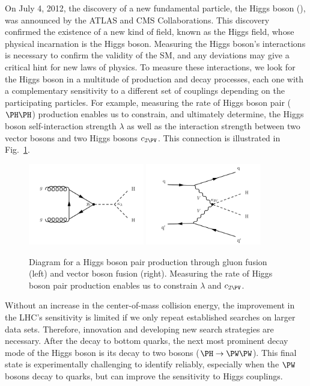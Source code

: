 \documentclass[11pt,letterpaper,notitlepage]{article}
\begin{document}
On July 4, 2012, the discovery of a new fundamental particle, the Higgs boson (\PH), was announced by the ATLAS and CMS Collaborations.
This discovery confirmed the existence of a new kind of field, known as the Higgs field, whose physical incarnation is the Higgs boson.
Measuring the Higgs boson's interactions is necessary to confirm the validity of the SM, and any deviations may give a critical hint for new laws of physics.
To measure these interactions, we look for the Higgs boson in a multitude of production and decay processes, each one with a complementary sensitivity to a different set of couplings depending on the participating particles.
For example, measuring the rate of Higgs boson pair ($\PH\PH$) production enables us to constrain, and ultimately determine, the Higgs boson self-interaction strength $\lambda$ as well as the interaction strength between two vector bosons and two Higgs bosons $c_{2\PV}$.
This connection is illustrated in Fig.~\ref{fig:higgs}.

\begin{figure}[htb]
    \centering
    \includegraphics[width=0.45\textwidth]{CMS-PAS-HIG-23-012_Figure_001-a.pdf}
    \includegraphics[width=0.45\textwidth]{CMS-PAS-HIG-23-012_Figure_001-e.pdf}
    \caption{
        Diagram for a Higgs boson pair production through gluon fusion (left) and vector boson fusion (right).
        Measuring the rate of Higgs boson pair production enables us to constrain $\lambda$ and $c_{2\PV}$.
        \label{fig:higgs}}
\end{figure}

Without an increase in the center-of-mass collision energy, the improvement in the LHC's sensitivity is limited if we only repeat established searches on larger data sets.
Therefore, innovation and developing new search strategies are necessary.
After the decay to bottom quarks, the next most prominent decay mode of the Higgs boson is its decay to two \PW bosons ($\PH\to\PW\PW$).
This final state is experimentally challenging to identify reliably, especially when the $\PW$ bosons decay to quarks, but can improve the sensitivity to Higgs couplings.
\end{document}
